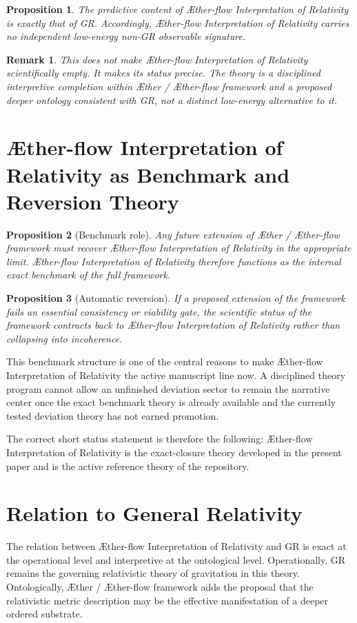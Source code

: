 \documentclass[11pt]{article}
\newcommand{\Aether}{\AE{}ther}
\newcommand{\Aflow}{\AE{}ther-flow}
\newcommand{\TheoryName}{\Aflow{} Interpretation of Relativity}
\newcommand{\TheoryProgram}{\Aether{} / \Aflow{} framework}
\newtheorem{proposition}{Proposition}
\newtheorem{remark}{Remark}
\begin{document}
\begin{proposition}
The predictive content of \TheoryName{} is exactly that of GR. Accordingly, \TheoryName{} carries no independent low-energy non-GR observable signature.
\end{proposition}

\begin{remark}
This does not make \TheoryName{} scientifically empty. It makes its status precise. The theory is a disciplined interpretive completion within \TheoryProgram{} and a proposed deeper ontology consistent with GR, not a distinct low-energy alternative to it.
\end{remark}

\section{\TheoryName{} as Benchmark and Reversion Theory}

\begin{proposition}[Benchmark role]
Any future extension of \TheoryProgram{} must recover \TheoryName{} in the appropriate limit. \TheoryName{} therefore functions as the internal exact benchmark of the full framework.
\end{proposition}

\begin{proposition}[Automatic reversion]
If a proposed extension of the framework fails an essential consistency or viability gate, the scientific status of the framework contracts back to \TheoryName{} rather than collapsing into incoherence.
\end{proposition}

This benchmark structure is one of the central reasons to make \TheoryName{} the active manuscript line now. A disciplined theory program cannot allow an unfinished deviation sector to remain the narrative center once the exact benchmark theory is already available and the currently tested deviation theory has not earned promotion.

The correct short status statement is therefore the following: \TheoryName{} is the exact-closure theory developed in the present paper and is the active reference theory of the repository.

\section{Relation to General Relativity}

The relation between \TheoryName{} and GR is exact at the operational level and interpretive at the ontological level. Operationally, GR remains the governing relativistic theory of gravitation in this theory. Ontologically, \TheoryProgram{} adds the proposal that the relativistic metric description may be the effective manifestation of a deeper ordered substrate.
\end{document}
